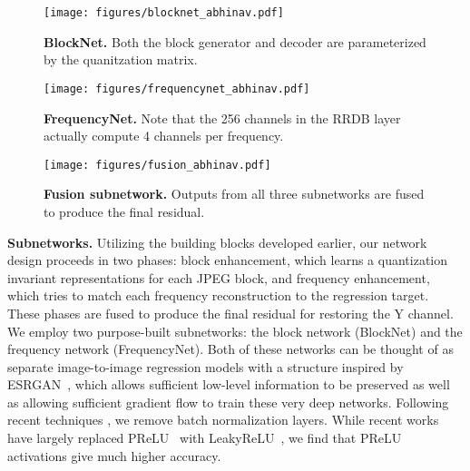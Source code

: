 \documentclass[runningheads]{llncs}
\begin{document}
\begin{figure}[t]
    \begin{minipage}[t]{0.32\linewidth}
        \centering
        \texttt{[image: figures/blocknet\_abhinav.pdf]}
        \caption{\textbf{BlockNet.} Both the block generator and decoder
        are parameterized by the quanitzation matrix.}
        \label{fig:blocknet}
    \end{minipage}
\hfill
    \begin{minipage}[t]{0.3\linewidth}
        \centering
        \texttt{[image: figures/frequencynet\_abhinav.pdf]}
        \caption{\textbf{FrequencyNet.} Note that the 256 channels in the
        RRDB layer actually compute 4 channels per frequency.}
        \label{fig:frequencynet}
    \end{minipage}
        \hfill
\begin{minipage}[t]{0.32\linewidth}
        \centering
        \texttt{[image: figures/fusion\_abhinav.pdf]}
        \caption{\textbf{Fusion subnetwork.} Outputs from all three subnetworks are fused to produce the final residual.}
        \label{fig:fusion}
    \end{minipage}   
\end{figure}

\noindent\textbf{Subnetworks.}
Utilizing the building blocks developed earlier, our network design proceeds in two phases: block enhancement, which learns a quantization invariant representations for each JPEG block, and frequency enhancement, which tries to match each frequency reconstruction to the regression target. These phases are fused to produce the final residual for restoring the Y channel. We employ two purpose-built subnetworks: the block network (BlockNet) and the frequency network (FrequencyNet). Both of these networks can be thought of as separate image-to-image regression models with a structure inspired by ESRGAN~\cite{wang2018esrgan}, which allows sufficient low-level information to be preserved as well as allowing sufficient gradient flow to train these very deep networks. Following recent techniques \cite{wang2018esrgan}, we remove batch normalization layers. While recent works have largely replaced PReLU~\cite{he2015delving} with LeakyReLU~\cite{maas2013rectifier, wang2018esrgan,galteri2017deep,galteri2019deep}, we find that PReLU activations give much higher accuracy.
\end{document}
